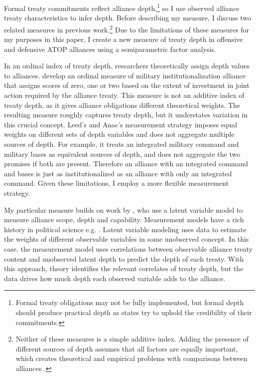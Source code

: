 \documentclass[12pt]{article}
\begin{document}
Formal treaty commitments reflect alliance depth,\footnote{Formal treaty obligations may not be fully implemented, but formal depth should produce practical depth as states try to uphold the credibility of their commitments.} so I use observed alliance treaty characteristics to infer depth. 
Before describing my measure, I discuss two related measures in previous work.\footnote{Neither of these measures is a simple additive index. Adding the presence of different sources of depth assumes that all factors are equally important, which creates theoretical and empirical problems with comparisons between alliances \citep[pg. 876]{BensonClinton2016}.} 
Due to the limitations of these measures for my purposes in this paper, I create a new measure of treaty depth in offensive and defensive ATOP alliances using a semiparametric factor analysis. 


In an ordinal index of treaty depth, researchers theoretically assign depth values to alliances. 
\citep{LeedsAnac2005} develop an ordinal measure of military institutionalization alliance that assigns scores of zero, one or two based on the extent of investment in joint action required by the alliance treaty. 
This measure is not an additive index of treaty depth, as it gives alliance obligations different theoretical weights.  
The resulting measure roughly captures treaty depth, but it understates variation in this crucial concept. 
Leed's and Anac's measurement strategy imposes equal weights on different sets of depth variables and does not aggregate multiple sources of depth. 
For example, it treats an integrated military command and military bases as equivalent sources of depth, and does not aggregate the two promises if both are present. 
Therefore an alliance with an integrated command and bases is just as institutionalized as an alliance with only an integrated command. 
Given these limitations, I employ a more flexible measurement strategy.


My particular measure builds on work by \citet{BensonClinton2016}, who use a latent variable model \citep{Quinn2004} to measure alliance scope, depth and capability.  
Measurement models have a rich history in political science e.g. \citep{Clintonetal2004, Fariss2014}.
Latent variable modeling uses data to estimate the weights of different observable variables in some unobserved concept. 
In this case, the measurement model uses correlations between observable alliance treaty content and unobserved latent depth to predict the depth of each treaty. 
With this approach, theory identifies the relevant correlates of treaty depth, but the data drives how much depth each observed variable adds to the alliance.
\end{document}
